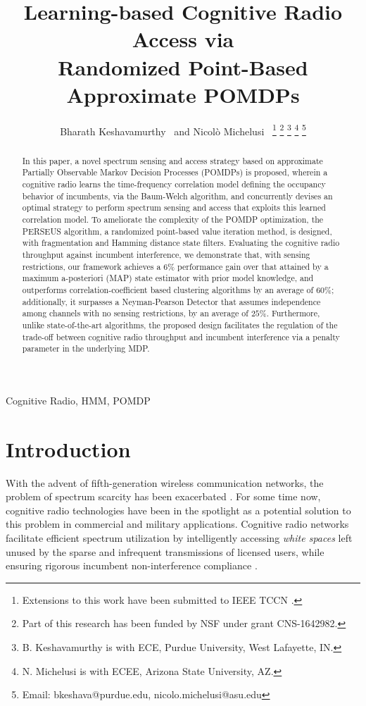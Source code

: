 \documentclass[10pt,twocolumn]{IEEEtran}
\title{Learning-based Cognitive Radio Access via
\\
Randomized Point-Based Approximate POMDPs}
\author{Bharath Keshavamurthy~\IEEEmembership{Student Member, ~IEEE} and Nicol\`{o} Michelusi~\IEEEmembership{Senior Member, ~IEEE}
\thanks{Extensions to this work have been submitted to IEEE TCCN \cite{TCCN:paper}.}
\thanks{Part of this research has been funded by NSF under grant CNS-1642982.}
\thanks{B. Keshavamurthy is with ECE, Purdue University, West Lafayette, IN.}
\thanks{N. Michelusi is with ECEE, Arizona State University, AZ.}
\thanks{Email: bkeshava@purdue.edu, nicolo.michelusi@asu.edu}
\vspace{-12mm}}
\begin{document}
\maketitle
\thispagestyle{empty}
\pagestyle{empty} 
\begin{abstract}
In this paper, a novel spectrum sensing and access strategy based on approximate Partially Observable Markov Decision Processes (POMDPs) is proposed, wherein a cognitive radio learns the time-frequency correlation model defining the occupancy behavior of incumbents, via the Baum-Welch algorithm, and concurrently devises an optimal strategy to perform spectrum sensing and access that exploits this learned correlation model. To ameliorate the complexity of the POMDP optimization, the PERSEUS algorithm, a randomized point-based value iteration method, is designed, with fragmentation and Hamming distance state filters. Evaluating the cognitive radio throughput against incumbent interference, we demonstrate that, with sensing restrictions, our framework achieves a $6$\% performance gain over that attained by a maximum a-posteriori (MAP) state estimator with prior model knowledge, and outperforms correlation-coefficient based clustering algorithms by an average of $60$\%; additionally, it surpasses a Neyman-Pearson Detector that assumes independence among channels with no sensing restrictions, by an average of $25$\%. Furthermore, unlike state-of-the-art algorithms,  the proposed design facilitates the regulation of the trade-off between cognitive radio throughput and incumbent interference via a penalty parameter in the underlying MDP.
\end{abstract}
\vspace{-3mm}
\begin{IEEEkeywords}
Cognitive Radio, HMM, POMDP
\end{IEEEkeywords}
\vspace{-5.5mm}
\section{Introduction}\label{I}
With the advent of fifth-generation wireless communication networks, the problem of spectrum scarcity has been exacerbated \cite{7158089}. For some time now, cognitive radio technologies have been in the spotlight as a potential solution to this problem in commercial and military applications. Cognitive radio networks facilitate efficient spectrum utilization by intelligently accessing \emph{white spaces} left unused by the sparse and infrequent transmissions of licensed users, while ensuring rigorous incumbent non-interference compliance \cite{4562537}.
\end{document}
